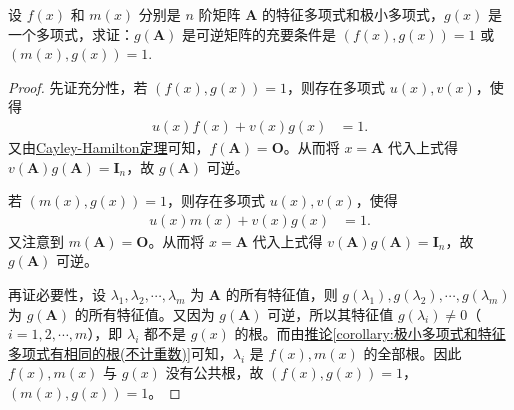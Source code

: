 \documentclass[../../main.tex]{subfiles}%
\begin{document}
\begin{proposition}\label{proposition:g(A)可逆与A的特征多项式与极小多项式的关系}
设 \(f(x)\) 和 \(m(x)\) 分别是 \(n\) 阶矩阵 \(\boldsymbol{A}\) 的特征多项式和极小多项式，\(g(x)\) 是一个多项式，求证：\(g(\boldsymbol{A})\) 是可逆矩阵的充要条件是 \((f(x),g(x)) = 1\) 或 \((m(x),g(x)) = 1\).
\end{proposition}
\begin{proof}
先证充分性，若 \((f(x),g(x)) = 1\)，则存在多项式 \(u(x),v(x)\)，使得
\begin{align*}
u(x)f(x)+v(x)g(x)&=1.
\end{align*}
又由\hyperref[theorem:Cayley-Hamilton定理]{Cayley-Hamilton定理}可知，\(f(\boldsymbol{A})=\boldsymbol{O}\)。从而将 \(x = \boldsymbol{A}\) 代入上式得 \(v(\boldsymbol{A})g(\boldsymbol{A})=\boldsymbol{I}_n\)，故 \(g(\boldsymbol{A})\) 可逆。

若 \((m(x),g(x)) = 1\)，则存在多项式 \(u(x),v(x)\)，使得
\begin{align*}
u(x)m(x)+v(x)g(x)&=1.
\end{align*}
又注意到 \(m(\boldsymbol{A})=\boldsymbol{O}\)。从而将 \(x = \boldsymbol{A}\) 代入上式得 \(v(\boldsymbol{A})g(\boldsymbol{A})=\boldsymbol{I}_n\)，故 \(g(\boldsymbol{A})\) 可逆。

再证必要性，设 \(\lambda_1,\lambda_2,\cdots,\lambda_m\) 为 \(\boldsymbol{A}\) 的所有特征值，则 \(g(\lambda_1),g(\lambda_2),\cdots,g(\lambda_m)\) 为 \(g(\boldsymbol{A})\) 的所有特征值。又因为 \(g(\boldsymbol{A})\) 可逆，所以其特征值 \(g(\lambda_i)\neq 0\)（\(i = 1,2,\cdots,m\)），即 \(\lambda_i\) 都不是 \(g(x)\) 的根。而由\hyperref[corollary:极小多项式和特征多项式有相同的根(不计重数)]{推论\ref{corollary:极小多项式和特征多项式有相同的根(不计重数)}}可知，\(\lambda_i\) 是 \(f(x),m(x)\) 的全部根。因此 \(f(x),m(x)\) 与 \(g(x)\) 没有公共根，故 \((f(x),g(x)) = 1\)，\((m(x),g(x)) = 1\)。 
\end{proof}
\end{document}
